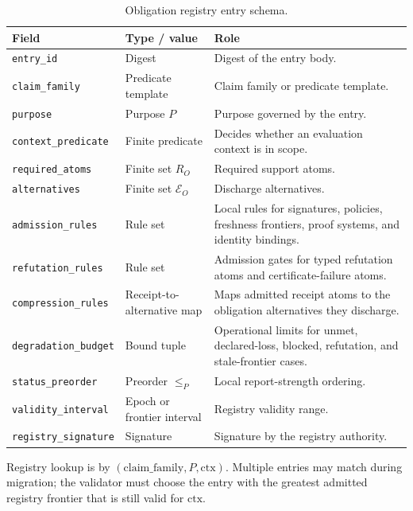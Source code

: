 \documentclass[11pt,twoside]{article}
\newcommand{\OGSchemaTableFont}{\footnotesize}
\newcommand{\OGTableHeaderRow}{\rowcolor{tableheaderbg}}
\newcommand{\TableHeaderRow}{\OGTableHeaderRow}
\newenvironment{OGTable}[2][ht]{%
  \begin{table}[#1]
  \centering
  #2
  \renewcommand{\arraystretch}{1.08}%
  \rowcolors{2}{tablerowbg}{white}%
}{%
  \rowcolors{2}{}{}%
  \end{table}%
}
\theoremstyle{definition}
\newcommand{\ctx}{\mathrm{ctx}}
\begin{document}
\begin{OGTable}{\OGSchemaTableFont}
\begin{tabularx}{\textwidth}{>{\raggedright\arraybackslash}p{}>{\raggedright\arraybackslash}p{}>{\raggedright\arraybackslash}X}
\toprule
\TableHeaderRow \textbf{Field} & \textbf{Type / value} & \textbf{Role} \\
\midrule
\texttt{entry\_id} & Digest & Digest of the entry body. \\
\texttt{claim\_family} & Predicate template & Claim family or predicate template. \\
\texttt{purpose} & Purpose $P$ & Purpose governed by the entry. \\
\texttt{context\_predicate} & Finite predicate & Decides whether an evaluation context is in scope. \\
\texttt{required\_atoms} & Finite set $R_O$ & Required support atoms. \\
\texttt{alternatives} & Finite set $\mathcal E_O$ & Discharge alternatives. \\
\texttt{admission\_rules} & Rule set & Local rules for signatures, policies, freshness frontiers, proof systems, and identity bindings. \\
\texttt{refutation\_rules} & Rule set & Admission gates for typed refutation atoms and certificate-failure atoms. \\
\texttt{compression\_rules} & Receipt-to-alternative map & Maps admitted receipt atoms to the obligation alternatives they discharge. \\
\texttt{degradation\_budget} & Bound tuple & Operational limits for unmet, declared-loss, blocked, refutation, and stale-frontier cases. \\
\texttt{status\_preorder} & Preorder $\leq_P$ & Local report-strength ordering. \\
\texttt{validity\_interval} & Epoch or frontier interval & Registry validity range. \\
\texttt{registry\_signature} & Signature & Signature by the registry authority. \\
\bottomrule
\end{tabularx}
\caption{Obligation registry entry schema.}
\label{tab:obligation-registry-schema}
\end{OGTable}
\FloatBarrier

Registry lookup is by $(\mathrm{claim\_family},P,\ctx)$. Multiple entries may
match during migration; the validator must choose the entry with the greatest
admitted registry frontier that is still valid for $\ctx$.
\end{document}
